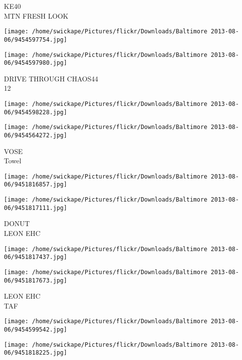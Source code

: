 \documentclass[10pt,letterpaper]{article}
\begin{document}
KE40\\
MTN FRESH LOOK\\
\pagebreak

\texttt{[image: /home/swickape/Pictures/flickr/Downloads/Baltimore 2013-08-06/9454597754.jpg]}

\vspace{0.25in}
\texttt{[image: /home/swickape/Pictures/flickr/Downloads/Baltimore 2013-08-06/9454597980.jpg]}

DRIVE THROUGH CHAOS44\\
12\\
\pagebreak

\texttt{[image: /home/swickape/Pictures/flickr/Downloads/Baltimore 2013-08-06/9454598228.jpg]}

\vspace{0.25in}
\texttt{[image: /home/swickape/Pictures/flickr/Downloads/Baltimore 2013-08-06/9454564272.jpg]}

VOSE\\
Towel\\
\pagebreak

\texttt{[image: /home/swickape/Pictures/flickr/Downloads/Baltimore 2013-08-06/9451816857.jpg]}

\vspace{0.25in}
\texttt{[image: /home/swickape/Pictures/flickr/Downloads/Baltimore 2013-08-06/9451817111.jpg]}

DONUT\\
LEON EHC\\
\pagebreak

\texttt{[image: /home/swickape/Pictures/flickr/Downloads/Baltimore 2013-08-06/9451817437.jpg]}

\vspace{0.25in}
\texttt{[image: /home/swickape/Pictures/flickr/Downloads/Baltimore 2013-08-06/9451817673.jpg]}

LEON EHC\\
TAF\\
\pagebreak

\texttt{[image: /home/swickape/Pictures/flickr/Downloads/Baltimore 2013-08-06/9454599542.jpg]}

\vspace{0.25in}
\texttt{[image: /home/swickape/Pictures/flickr/Downloads/Baltimore 2013-08-06/9451818225.jpg]}
\end{document}
